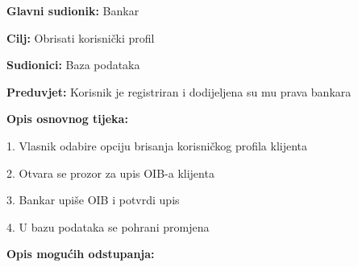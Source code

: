 \noindent {}
\begin{packed_item}

  \item \textbf{Glavni sudionik: }Bankar
  \item  \textbf{Cilj:} Obrisati korisnički profil 
  \item  \textbf{Sudionici:} Baza podataka
  \item  \textbf{Preduvjet:} Korisnik je registriran i dodijeljena su mu prava bankara 
  \item  \textbf{Opis osnovnog tijeka:}
  
  \item[] \begin{packed_enum}

    \item 1. Vlasnik odabire  opciju brisanja korisničkog profila klijenta
    \item 2. Otvara se prozor za upis OIB-a klijenta
    \item 3. Bankar  upiše OIB  i potvrdi upis
    \item 4. U bazu podataka se pohrani promjena 
  \end{packed_enum}
  
  \item  \textbf{Opis mogućih odstupanja:}
  
  \item[] 
\end{packed_item}

